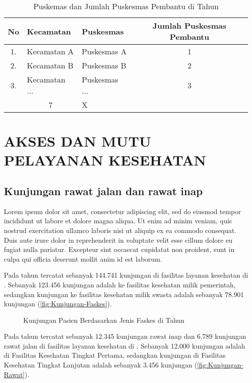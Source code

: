 \begin{table}[!ht]
\caption{Puskemas dan Jumlah Puskesmas Pembantu di \namaKabupaten Tahun \tP}
\label{tab:Puskemas-dan-Pustu}
\centering{}%

\begin{tabular}{cllc}
\toprule
No & Kecamatan & \multicolumn{1}{l}{Puskesmas} & Jumlah Puskesmas Pembantu\\
\midrule
1. & Kecamatan A & Puskesmas A & 1\\
\rowcolor{black!20}2. & Kecamatan B & Puskesmas B & 2\\
3. & Kecamatan ... & Puskesmas ... & 3\\
\midrule
\rowcolor{blue!20}\multicolumn{2}{c}{Jumlah} & \multicolumn{1}{c}{7} & X\\
\bottomrule
\end{tabular}
\end{table}

\section{AKSES DAN MUTU PELAYANAN KESEHATAN}
\subsection{Kunjungan rawat jalan dan rawat inap}
Lorem ipsum dolor sit amet, consectetur adipiscing elit, sed do eiusmod tempor incididunt ut labore et dolore magna aliqua. Ut enim ad minim veniam, quis nostrud exercitation ullamco laboris nisi ut aliquip ex ea commodo consequat. Duis aute irure dolor in reprehenderit in voluptate velit esse cillum dolore eu fugiat nulla pariatur. Excepteur sint occaecat cupidatat non proident, sunt in culpa qui officia deserunt mollit anim id est laborum.

Pada tahun \tP tercatat sebanyak 144.741 kunjungan di fasilitas layanan kesehatan di \namaKabupaten. Sebanyak 123.456 kunjungan adalah ke fasilitas kesehatan milik pemerintah, sedangkan kunjungan ke fasilitas kesehatan milik swasta adalah sebanyak 78.901 kunjungan (\autoref{fig:Kunjungan-Faskes}).

\begin{figure}[!htb]
	\centering{}
	\caption{Kunjungan Pasien Berdasarkan Jenis Faskes di \namaKabupaten Tahun \tP}
	\label{fig:Kunjungan-Faskes}
\end{figure}

Pada tahun \tP tercatat sebanyak 12.345 kunjungan rawat inap dan 6.789 kunjungan rawat jalan di fasilitas layanan kesehatan di \namaKabupaten. Sebanyak 12.000 kunjungan adalah di Fasilitas Kesehatan Tingkat Pertama, sedangkan kunjungan di Fasilitas Kesehatan Tingkat Lanjutan adalah sebanyak 3.456 kunjungan (\autoref{fig:Kunjungan-Rawat}).

